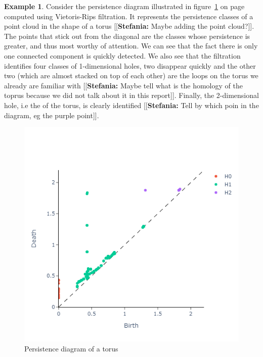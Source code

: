 \documentclass{article}
\newcommand{\ste}[1]{{\color{green}[[\textbf{Stefania: }#1]]}}
\theoremstyle{plain}
\theoremstyle{definition}
\newtheorem{example}[thm]{Example}
\theoremstyle{remark}
\begin{document}
\begin{example}
Consider the persistence diagram illustrated in figure~\ref{fig:torus-rips-persisntence} on page~\pageref{fig:torus-rips-persisntence} computed using Vietoris-Rips filtration. It represents the persistence classes of a point cloud in the shape of a torus \ste{Maybe adding the point cloud?}. The points that stick out from the diagonal are the classes whose persistence is greater, and thus most worthy of attention. We can see that the fact there is only one connected component is quickly detected. We also see that the filtration identifies four classes of 1-dimensional holes, two disappear quickly and the other two (which are almost stacked on top of each other) are the loops on the torus we already are familiar with \ste{Maybe tell what is the homology of the toprus because we did not talk about it in this report}. Finally, the 2-dimensional hole, i.e the  of the torus, is clearly identified \ste{Tell by which poin in the diagram, eg the purple point}.
\end{example}

\begin{figure}[ht]
    \centering
    \includegraphics[scale=.5]{torus-rips-persistence.png}
    \caption{Persistence diagram of a torus}
    \label{fig:torus-rips-persisntence}
\end{figure}
\end{document}
